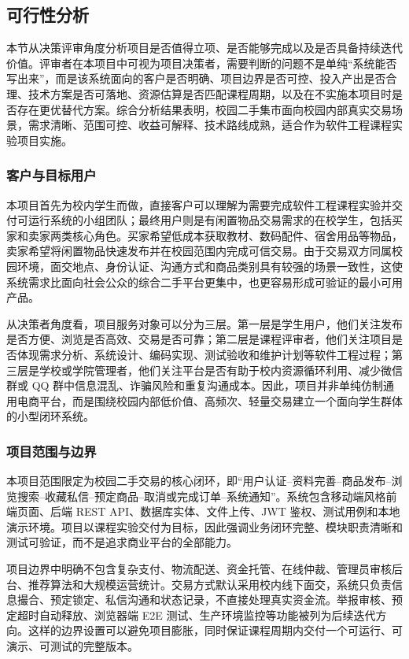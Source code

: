 ﻿\documentclass[UTF8,a4paper,12pt]{ctexart}
\newcommand{\projectname}{校园二手集市}
\begin{document}
\subsection{可行性分析}
本节从决策评审角度分析项目是否值得立项、是否能够完成以及是否具备持续迭代价值。评审者在本项目中可视为项目决策者，需要判断的问题不是单纯“系统能否写出来”，而是该系统面向的客户是否明确、项目边界是否可控、投入产出是否合理、技术方案是否可落地、资源估算是否匹配课程周期，以及在不实施本项目时是否存在更优替代方案。综合分析结果表明，\projectname{}面向校园内部真实交易场景，需求清晰、范围可控、收益可解释、技术路线成熟，适合作为软件工程课程实验项目实施。

\subsubsection{客户与目标用户}
本项目首先为校内学生而做，直接客户可以理解为需要完成软件工程课程实验并交付可运行系统的小组团队；最终用户则是有闲置物品交易需求的在校学生，包括买家和卖家两类核心角色。买家希望低成本获取教材、数码配件、宿舍用品等物品，卖家希望将闲置物品快速发布并在校园范围内完成可信交易。由于交易双方同属校园环境，面交地点、身份认证、沟通方式和商品类别具有较强的场景一致性，这使系统需求比面向社会公众的综合二手平台更集中，也更容易形成可验证的最小可用产品。

从决策者角度看，项目服务对象可以分为三层。第一层是学生用户，他们关注发布是否方便、浏览是否高效、交易是否可靠；第二层是课程评审者，他们关注项目是否体现需求分析、系统设计、编码实现、测试验收和维护计划等软件工程过程；第三层是学校或学院管理者，他们关注平台是否有助于校内资源循环利用、减少微信群或 QQ 群中信息混乱、诈骗风险和重复沟通成本。因此，项目并非单纯仿制通用电商平台，而是围绕校园内部低价值、高频次、轻量交易建立一个面向学生群体的小型闭环系统。

\subsubsection{项目范围与边界}
本项目范围限定为校园二手交易的核心闭环，即“用户认证--资料完善--商品发布--浏览搜索--收藏私信--预定商品--取消或完成订单--系统通知”。系统包含移动端风格前端页面、后端 REST API、数据库实体、文件上传、JWT 鉴权、测试用例和本地演示环境。项目以课程实验交付为目标，因此强调业务闭环完整、模块职责清晰和测试可验证，而不是追求商业平台的全部能力。

项目边界中明确不包含复杂支付、物流配送、资金托管、在线仲裁、管理员审核后台、推荐算法和大规模运营统计。交易方式默认采用校内线下面交，系统只负责信息撮合、预定锁定、私信沟通和状态记录，不直接处理真实资金流。举报审核、预定超时自动释放、浏览器端 E2E 测试、生产环境监控等功能被列为后续迭代方向。这样的边界设置可以避免项目膨胀，同时保证课程周期内交付一个可运行、可演示、可测试的完整版本。
\end{document}
